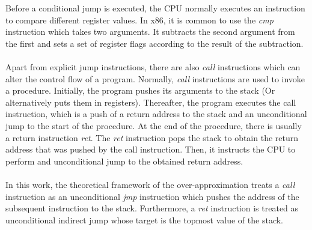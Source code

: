 \documentclass{kththesis}
\begin{document}
Before a conditional jump is executed, the CPU normally executes an instruction to compare different register values. In x86, it is common to use the \textit{cmp} instruction which takes two arguments. It subtracts the second argument from the first and sets a set of register flags according to the result of the subtraction. %
\\ \\
Apart from explicit jump instructions, there are also \textit{call} instructions which can alter the control flow of a program. Normally, \textit{call} instructions are used to invoke a procedure. Initially, the program pushes its arguments to the stack (Or alternatively puts them in registers). Thereafter, the program executes the call instruction, which is a push of a return address to the stack and an unconditional jump to the start of the procedure. At the end of the procedure, there is usually a return instruction \textit{ret}. The \textit{ret} instruction pops the stack to obtain the return address that was pushed by the call instruction. Then, it instructs the CPU to perform and unconditional jump to the obtained return address. 
\\ \\ 
In this work, the theoretical framework of the over-approximation treats a \textit{call} instruction as an unconditional \textit{jmp} instruction which pushes the address of the subsequent instruction to the stack. Furthermore, a \textit{ret} instruction is treated as unconditional indirect jump whose target is the topmost value of the stack.
\end{document}
